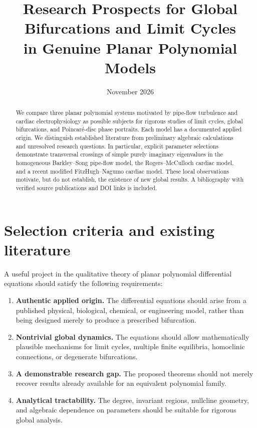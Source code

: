 \documentclass[11pt,a4paper]{article}
\title{Research Prospects for Global Bifurcations and Limit Cycles\\
       in Genuine Planar Polynomial Models}
\author{}
\date{November 2026}
\begin{document}
\maketitle

\begin{abstract}
We compare three planar polynomial systems motivated by pipe-flow turbulence and cardiac electrophysiology as possible subjects for rigorous studies of limit cycles, global bifurcations, and Poincar\'e-disc phase portraits. Each model has a documented applied origin. We distinguish established literature from preliminary algebraic calculations and unresolved research questions. In particular, explicit parameter selections demonstrate transversal crossings of simple purely imaginary eigenvalues in the homogeneous Barkley--Song pipe-flow model, the Rogers--McCulloch cardiac model, and a recent modified FitzHugh--Nagumo cardiac model. These local observations motivate, but do not establish, the existence of new global results. A bibliography with verified source publications and DOI links is included.
\end{abstract}

\section{Selection criteria and existing literature}

A useful project in the qualitative theory of planar polynomial differential equations should satisfy the following requirements:
\begin{enumerate}
\item \textbf{Authentic applied origin.} The differential equations should arise from a published physical, biological, chemical, or engineering model, rather than being designed merely to produce a prescribed bifurcation.
\item \textbf{Nontrivial global dynamics.} The equations should allow mathematically plausible mechanisms for limit cycles, multiple finite equilibria, homoclinic connections, or degenerate bifurcations.
\item \textbf{A demonstrable research gap.} The proposed theorems should not merely recover results already available for an equivalent polynomial family.
\item \textbf{Analytical tractability.} The degree, invariant regions, nullcline geometry, and algebraic dependence on parameters should be suitable for rigorous global analysis.
\end{enumerate}
\end{document}
